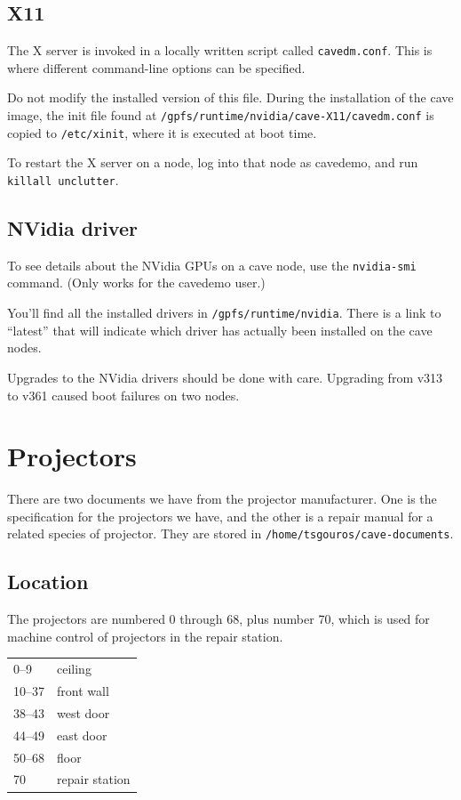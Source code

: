 \documentclass[11pt]{article}
\newcommand{\cmd}[1]{\texttt{#1}\xspace}
\begin{document}
\subsection{X11}

The X server is invoked in a locally written script called
\cmd{cavedm.conf}.  This is where different command-line options
can be specified.

Do not modify the installed version of this file.  During the
installation of the cave image, the init file found at
\cmd{/gpfs/runtime/nvidia/cave-X11/cavedm.conf} is copied to
\cmd{/etc/xinit}, where it is executed at boot time.

To restart the X server on a node, log into that node as cavedemo, and
run \cmd{killall unclutter}.


\subsection{NVidia driver}

To see details about the NVidia GPUs on a cave node, use the
\cmd{nvidia-smi} command.  (Only works for the cavedemo user.)

You'll find all the installed drivers in
\cmd{/gpfs/runtime/nvidia}.  There is a link to ``latest'' that
will indicate which driver has actually been installed on the cave nodes.

Upgrades to the NVidia drivers should be done with care.  Upgrading
from v313 to v361 caused boot failures on two nodes.


\section{Projectors}

There are two documents we have from the projector manufacturer.  One
is the specification for the projectors we have, and the other is a
repair manual for a related species of projector.  They are stored in
\cmd{/home/tsgouros/cave-documents}.


\subsection{Location}

The projectors are numbered 0 through 68, plus number 70, which is
used for machine control of projectors in the repair station.

\begin{center}
\begin{tabular}{ll}
0--9 & ceiling \\
10--37 & front wall \\
38--43 & west door \\
44--49 & east door \\
50--68 & floor \\
70 & repair station
\end{tabular}
\end{center}
\end{document}

